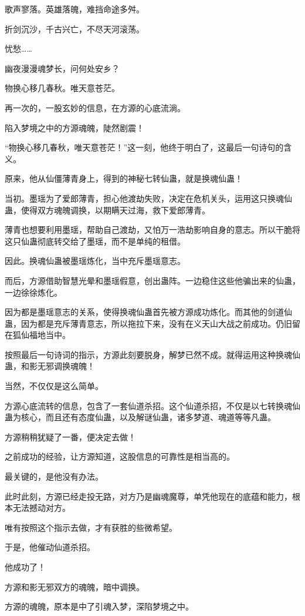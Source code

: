 \begin{this_body}
歌声寥落。英雄落魄，难挡命途多舛。

折剑沉沙，千古兴亡，不尽天河滚荡。

忧愁……

幽夜漫漫魂梦长，问何处安乡？

物换心移几春秋。唯天意苍茫。

再一次的，一股玄妙的信息，在方源的心底流淌。

陷入梦境之中的方源魂魄，陡然剧震！

“物换心移几春秋，唯天意苍茫！”这一刻，他终于明白了，这最后一句诗句的含义。

原来，他从仙僵薄青身上，得到的神秘七转仙蛊，就是换魂仙蛊！

当初。墨瑶为了爱郎薄青，担心他渡劫失败，决定在危机关头，运用这只换魂仙蛊，使得双方魂魄调换，以期瞒天过海，救下爱郎薄青。

薄青也想要利用墨瑶，帮助自己渡劫，又怕万一浩劫影响自身的意志。所以干脆将这只仙蛊彻底转交给了墨瑶，而不是单纯的租借。

因此。换魂仙蛊被墨瑶炼化，当中充斥墨瑶意志。

而后，方源借助智慧光晕和墨瑶假意，创出蛊阵。一边稳住这些他骗出来的仙蛊，一边徐徐炼化。

因为都是墨瑶意志的关系，使得换魂仙蛊首先被方源成功炼化。而其他的剑道仙蛊，因为都是充斥薄青意志，所以拖拉下来，没有在义天山大战之前成功。仍旧留在狐仙福地当中。

按照最后一句诗词的指示，方源此刻要脱身，解梦已然不成。就得运用这种换魂仙蛊，和影无邪调换魂魄！

当然，不仅仅是这么简单。

方源心底流转的信息，包含了一套仙道杀招。这个仙道杀招，不仅是以七转换魂仙蛊为核心，而且还有态度仙蛊，以及解谜仙蛊，诸多梦道、魂道等等凡蛊。

方源稍稍犹疑了一番，便决定去做！

之前成功的经验，让方源知道，这股信息的可靠性是相当高的。

最关键的，是他没有办法。

此时此刻，方源已经走投无路，对方乃是幽魂魔尊，单凭他现在的底蕴和能力，根本无法撼动对方。

唯有按照这个指示去做，才有获胜的些微希望。

于是，他催动仙道杀招。

他成功了！

方源和影无邪双方的魂魄，暗中调换。

方源的魂魄，原本是中了引魂入梦，深陷梦境之中。


\end{this_body}
